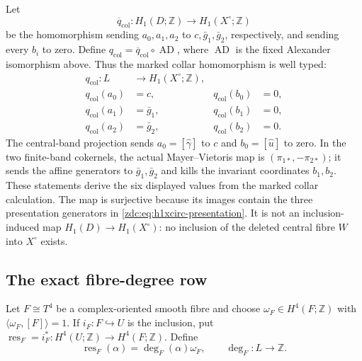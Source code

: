 Let
\[
 \overline q_{\mathrm{col}}:H_1(D;\mathbb Z)
 \longrightarrow H_1(X^\circ;\mathbb Z)
\]
be the homomorphism sending $a_0,a_1,a_2$ to
$c,\bar g_1,\bar g_2$, respectively, and sending every $b_i$ to zero.
Define $q_{\mathrm{col}}=\overline q_{\mathrm{col}}\circ\operatorname{AD}$,
where $\operatorname{AD}$ is the fixed Alexander isomorphism above.  Thus
the marked collar homomorphism is well typed:
\begin{equation}
 \begin{aligned}
 q_{\mathrm{col}}:L&\longrightarrow H_1(X^\circ;\mathbb Z),\\
 q_{\mathrm{col}}(a_0)&=c,&q_{\mathrm{col}}(b_0)&=0,\\
 q_{\mathrm{col}}(a_1)&=\bar g_1,&q_{\mathrm{col}}(b_1)&=0,\\
 q_{\mathrm{col}}(a_2)&=\bar g_2,&q_{\mathrm{col}}(b_2)&=0.
 \end{aligned}
 \label{zdc:eq:qcol}
\end{equation}
The central-band projection sends $a_0=[\widehat\gamma]$ to $c$ and
$b_0=[\widehat u]$ to zero.  In the two finite-band cokernels, the actual
Mayer--Vietoris map is $(\pi_{1*},-\pi_{2*})$; it sends the affine generators
to $\bar g_1,\bar g_2$ and kills the invariant coordinates $b_1,b_2$.
These statements derive the six displayed values from the marked collar
calculation.  The map is surjective because its images contain the three
presentation generators in \eqref{zdc:eq:h1xcirc-presentation}.  It is not
an inclusion-induced map $H_1(D)\to H_1(X^\circ)$: no inclusion of the
deleted central fibre $W$ into $X^\circ$ exists.

\subsection{The exact fibre-degree row}
\label{zdc:subsec:fibre-degree}

Let $F\cong T^4$ be a complex-oriented smooth fibre and choose
\(\omega_F\in H^4(F;\mathbb Z)\) with
\(\langle\omega_F,[F]\rangle=1\).  If $i_F:F\hookrightarrow U$ is the
inclusion, put $\operatorname{res}_F=i_F^*:H^4(U;\mathbb Z)\to
H^4(F;\mathbb Z)$.  Define
\begin{equation}
 \operatorname{res}_F(\alpha)=\deg_F(\alpha)\omega_F,
 \qquad
 \deg_F:L\longrightarrow\mathbb Z.
 \label{zdc:eq:degree-definition}
\end{equation}

